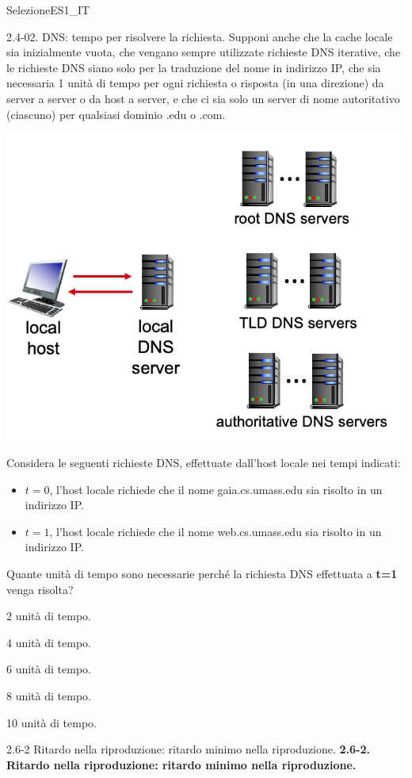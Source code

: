\documentclass[a4paper]{article}
\begin{document}
\begin{quiz}{SelezioneES1\_IT}
\begin{multi}[points=1,shuffle]{2.4-02. DNS: tempo per risolvere la richiesta.}
Supponi anche che la cache locale sia inizialmente vuota, che vengano sempre utilizzate richieste DNS iterative, che le richieste DNS siano solo per la traduzione del nome in indirizzo IP, che sia necessaria 1 unità di tempo per ogni richiesta o risposta (in una direzione) da server a server o da host a server, e che ci sia solo un server di nome autoritativo (ciascuno) per qualsiasi dominio .edu o .com.
\begin{center}
\includegraphics[width=\linewidth]{figs/2.4.4.jpg}
\end{center}

Considera le seguenti richieste DNS, effettuate dall'host locale nei tempi indicati:
\begin{itemize}
	\item $t=0$, l'host locale richiede che il nome gaia.cs.umass.edu sia risolto in un indirizzo IP.
	\item $t=1$, l'host locale richiede che il nome web.cs.umass.edu sia risolto in un indirizzo IP.
\end{itemize}

Quante unità di tempo sono necessarie perché la richiesta DNS effettuata a \textbf{t=1} venga risolta?
\item 2 unità di tempo.
\item 4 unità di tempo.
\item 6 unità di tempo.
\item 8 unità di tempo.
\item* 10 unità di tempo.
\end{multi}

\begin{multi}[points=1,shuffle]{2.6-2 Ritardo nella riproduzione: ritardo minimo nella riproduzione.}
\textbf{2.6-2. Ritardo nella riproduzione: ritardo minimo nella riproduzione.}


\end{multi}
\end{quiz}
\end{document}
